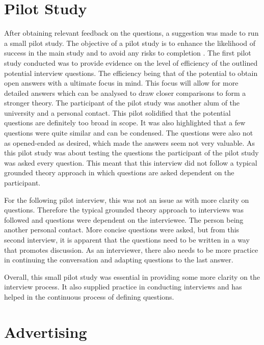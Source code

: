 \section{Pilot Study}

\par After obtaining relevant feedback on the questions, a suggestion was made to run a small pilot study.  The objective of a pilot study is to enhance the likelihood of success in the main study and to avoid any risks to completion \cite{pilot}. The first pilot study conducted was to provide evidence on the level of efficiency of the outlined potential interview questions. The efficiency being that of the potential to obtain open answers with a ultimate focus in mind. This focus will allow for more detailed answers which can be analysed to draw closer comparisons to form a stronger theory. The participant of the pilot study was another alum of the university and a personal contact. This pilot solidified that the potential questions are definitely too broad in scope. It was also highlighted that a few questions were quite similar and can be condensed. The questions were also not as opened-ended as desired, which made the answers seem not very valuable. As this pilot study was about testing the questions the participant of the pilot study was asked every question. This meant that this interview did not follow a typical grounded theory approach in which questions are asked dependent on the participant. 
\newline
\par For the following pilot interview, this was not an issue as with more clarity on questions. Therefore the typical grounded theory approach to interviews was followed and questions were dependent on the interviewee. The person being another personal contact. More concise questions were asked, but from this second interview, it is apparent that the questions need to be written in a way that promotes discussion. As an interviewer, there also needs to be more practice in continuing the conversation and adapting questions to the last answer. 
\newline
\par Overall, this small pilot study was essential in providing some more clarity on the interview process. It also supplied practice in conducting interviews and has helped in the continuous process of defining questions. 

\section{Advertising}

